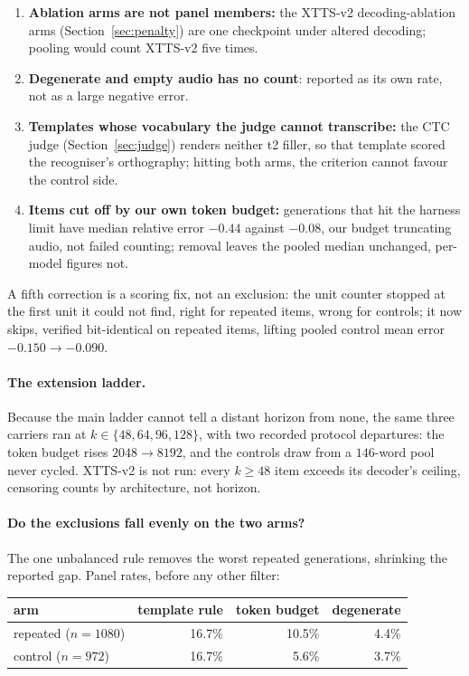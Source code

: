 \begin{enumerate}
\item \textbf{Ablation arms are not panel members:} the XTTS-v2 decoding-ablation arms
(Section~\ref{sec:penalty}) are one checkpoint under altered decoding; pooling would count XTTS-v2
five times.
\item \textbf{Degenerate and empty audio has no count}: reported as its own rate, not as a large
negative error.
\item \textbf{Templates whose vocabulary the judge cannot transcribe:} the CTC judge
(Section~\ref{sec:judge}) renders neither t2 filler, so that template scored the recogniser's
orthography; hitting both arms, the criterion cannot favour the control side.
\item \textbf{Items cut off by our own token budget:} generations that hit the harness limit have
median relative error $-0.44$ against $-0.08$, our budget truncating audio, not failed counting;
removal leaves the pooled median unchanged, per-model figures not.
\end{enumerate}

A fifth correction is a scoring fix, not an exclusion: the unit counter stopped at the first unit
it could not find, right for repeated items, wrong for controls; it now skips, verified
bit-identical on repeated items, lifting pooled control mean error $-0.150\to-0.090$.

\paragraph{The extension ladder.} Because the main ladder cannot tell a distant horizon from
none, the same three carriers ran at $k\in\{48,64,96,128\}$, with two recorded protocol
departures: the token budget rises $2048\to8192$, and the controls draw from a $146$-word pool
never cycled. XTTS-v2 is not run: every $k\ge48$ item exceeds its decoder's ceiling, censoring
counts by architecture, not horizon.

\paragraph{Do the exclusions fall evenly on the two arms?} The one unbalanced rule removes the
worst repeated generations, shrinking the reported gap. Panel rates, before any other filter:

\begin{center}
\begin{tabular}{lrrr}
\toprule
arm & template rule & token budget & degenerate \\
\midrule
repeated ($n=1080$) & 16.7\% & 10.5\% & 4.4\% \\
control ($n=972$)   & 16.7\% & 5.6\%  & 3.7\% \\
\bottomrule
\end{tabular}
\end{center}

